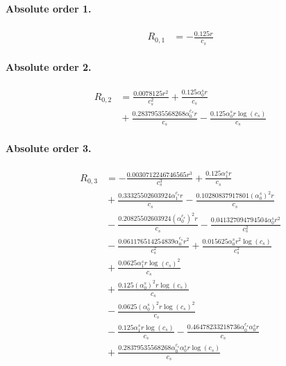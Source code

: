 \documentclass[10pt]{article}
\begin{document}
\paragraph{Absolute order 1.}
\begin{align*}
R_{0,1} &=  - \frac{0.125 r}{c_{s}}
\end{align*}

\paragraph{Absolute order 2.}
\begin{align*}
R_{0,2} &= \frac{0.0078125 r^{2}}{c_{s}^{2}} + \frac{0.125 \alpha_{0}^s r}{c_{s}} \\
&{}  + \frac{0.28379535568268 \alpha_{0}^{c_s} r}{c_{s}} - \frac{0.125 \alpha_{0}^s r \log{\left(c_{s} \right)}}{c_{s}}
\end{align*}

\paragraph{Absolute order 3.}
\begin{align*}
R_{0,3} &=  - \frac{0.0030712246746565 r^{3}}{c_{s}^{3}} + \frac{0.125 \alpha_{1}^s r}{c_{s}} \\
&{}  + \frac{0.33325502603924 \alpha_{1}^{c_s} r}{c_{s}} - \frac{0.10280837917801 \left(\alpha_{0}^s\right)^{2} r}{c_{s}} \\
&{}  - \frac{0.20825502603924 \left(\alpha_{0}^{c_s}\right)^{2} r}{c_{s}} - \frac{0.041327094794504 \alpha_{0}^s r^{2}}{c_{s}^{2}} \\
&{}  - \frac{0.061176514254839 \alpha_{0}^{c_s} r^{2}}{c_{s}^{2}} + \frac{0.015625 \alpha_{0}^s r^{2} \log{\left(c_{s} \right)}}{c_{s}^{2}} \\
&{}  + \frac{0.0625 \alpha_{1}^s r \log{\left(c_{s} \right)}^{2}}{c_{s}} \\
&{}  + \frac{0.125 \left(\alpha_{0}^s\right)^{2} r \log{\left(c_{s} \right)}}{c_{s}} \\
&{}  - \frac{0.0625 \left(\alpha_{0}^s\right)^{2} r \log{\left(c_{s} \right)}^{2}}{c_{s}} \\
&{}  - \frac{0.125 \alpha_{1}^s r \log{\left(c_{s} \right)}}{c_{s}} - \frac{0.46478233218736 \alpha_{0}^{c_s} \alpha_{0}^s r}{c_{s}} \\
&{}  + \frac{0.28379535568268 \alpha_{0}^{c_s} \alpha_{0}^s r \log{\left(c_{s} \right)}}{c_{s}}
\end{align*}
\end{document}
